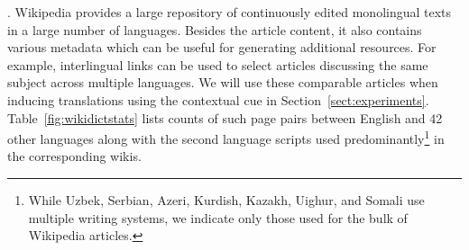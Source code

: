 \documentclass{article}
\newcommand{\secref}[1]{Section~\ref{#1}}
\newcommand{\tabref}[1]{Table~\ref{#1}}
\begin{document}
. Wikipedia provides a large repository of continuously edited monolingual texts in a large number of languages.  Besides the article content, it also contains various metadata which can be useful for generating additional resources.  For example,
interlingual links can be used to select articles discussing the same subject across multiple languages.  We will use these comparable articles when inducing translations using the contextual cue in \secref{sect:experiments}.  \tabref{fig:wikidictstats} lists counts of such page pairs between English and 42 other languages along with the second language scripts used predominantly\footnote{While Uzbek, Serbian, Azeri, Kurdish, Kazakh, Uighur, and Somali use multiple writing systems, we indicate only those used for the bulk of Wikipedia articles.} in the corresponding wikis.\\
 
\end{document}
